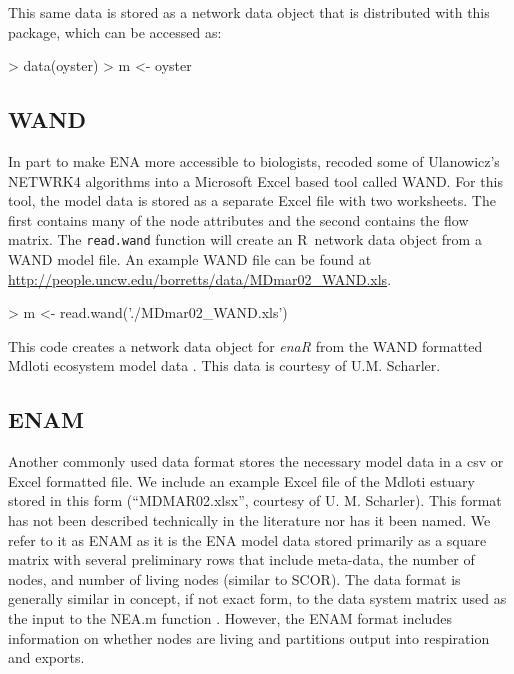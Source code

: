 \documentclass[11pt]{article}
\def\R{\textsf{R}}
\begin{document}
This same data is stored as a network data object that is distributed
with this package, which can be accessed as:
\begin{Schunk}
\begin{Sinput}
> data(oyster)
> m <- oyster
\end{Sinput}
\end{Schunk}

\subsection*{WAND}
In part to make ENA more accessible to biologists,
\citet{allesina04_wand} recoded some of Ulanowicz's NETWRK4 algorithms
into a Microsoft Excel based tool called WAND.  For this tool, the
model data is stored as a separate Excel file with two worksheets.
The first contains many of the node attributes and the second contains the
flow matrix.  The \texttt{read.wand} function will create an \R\
network data object from a WAND model file. An example WAND file can
be found at \url{http://people.uncw.edu/borretts/data/MDmar02_WAND.xls}.

\begin{Schunk}
\begin{Sinput}
>   m <- read.wand('./MDmar02_WAND.xls')
\end{Sinput}
\end{Schunk}

This code creates a network data object for \textit{enaR} from the WAND
formatted Mdloti ecosystem model data
\citep{scharler2012ecosystem}. This data is courtesy of U.M. Scharler.

\subsection*{ENAM}

Another commonly used data format stores the necessary model data in a
csv or Excel formatted file.  We include an example Excel file of the
Mdloti estuary stored in this form (``MDMAR02.xlsx'', courtesy
of U. M. Scharler).  This format has not been described technically in
the literature nor has it been named.  We refer to it as ENAM as it is
the ENA model data stored primarily as a square matrix with several
preliminary rows that include meta-data, the number of nodes, and
number of living nodes (similar to SCOR).  The data format is
generally similar in concept, if not exact form, to the data system
matrix used as the input to the NEA.m function \citep{fath06}.
However, the ENAM format includes information on whether nodes are
living and partitions output into respiration and exports.
\end{document}
